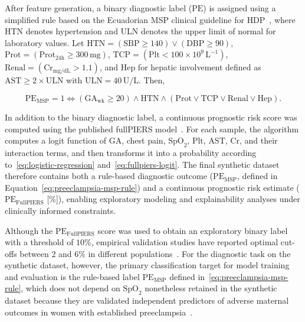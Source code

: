 \documentclass[diagnostics,article,accept,pdftex,moreauthors]{Definitions/mdpi}
\begin{document}
After feature generation, a binary diagnostic label
($\mathrm{PE}$) is assigned using a simplified rule based on the
Ecuadorian \ac{MSP} clinical guideline for \ac{HDP}~\cite{msp_ecuador_hdp_2013},
where \ac{HTN} denotes hypertension and \ac{ULN} denotes the upper limit of
normal for laboratory values.
Let \(\mathrm{HTN}=(\mathrm{SBP}\geq 140)\lor(\mathrm{DBP}\geq 90)\),
\(\mathrm{Prot}=(\mathrm{Prot_{24h}}\geq 300\,\mathrm{mg})\),
\(\mathrm{TCP}=(\mathrm{Plt}<100\times10^{9}\,\mathrm{L}^{-1})\),
\(\mathrm{Renal}=(\mathrm{Cr}_{\mathrm{mg/dL}}>1.1)\), and
\(\mathrm{Hep}\) for hepatic involvement defined as
\(\mathrm{AST}\geq 2\times\mathrm{ULN}\) with
\(\mathrm{ULN}=40\,\mathrm{U/L}\). Then,
\begin{linenomath}
\begin{equation}
\mathrm{PE}_{\mathrm{MSP}}=1
\iff
(\mathrm{GA_{wk}}\geq 20)\land \mathrm{HTN}
\land (\mathrm{Prot}\lor \mathrm{TCP}\lor \mathrm{Renal}\lor \mathrm{Hep}).
\label{eq:preeclampsia-msp-rule}
\end{equation}
\end{linenomath}

In addition to the binary diagnostic label, a continuous prognostic
risk score was computed using the published fullPIERS
model~\cite{fullpiers_2011}. For each sample, the algorithm computes a
logit function of \ac{GA}, chest {pain}, $\text{SpO}_2$, %
$\mathrm{Plt}$, \ac{AST}, $\mathrm{Cr}$, and their interaction terms,
and then transforms it into a probability according
to~\eqref{eq:logistic-regression} and~\eqref{eq:fullpiers-logit}.
The final synthetic dataset therefore contains both a rule-based
diagnostic outcome ($\mathrm{PE}_{\mathrm{MSP}}$, defined in
Equation~\eqref{eq:preeclampsia-msp-rule}) and a continuous prognostic
risk estimate ($\mathrm{PE}_{\mathrm{FullPIERS}}$ [\%]), enabling exploratory
modeling and explainability analyses under clinically informed
constraints.

Although the $\mathrm{PE}_{\mathrm{FullPIERS}}$ score was used to
obtain an exploratory binary label with a threshold of $10\%$, empirical
validation studies have reported optimal cut-offs between 2 and 6\%
in different populations~\cite{long2025fullpiers,teichmann2025fullpiers,elongi2025fullpiers}.
For the diagnostic task on the synthetic dataset, however, the primary
classification target for model training and evaluation is the rule-based
label $\mathrm{PE}_{\mathrm{MSP}}$ defined in~\eqref{eq:preeclampsia-msp-rule},
which does not depend {on} $\text{SpO}_2$ %
nonetheless retained in the synthetic dataset because they are validated
independent predictors of adverse maternal outcomes in women with
established preeclampsia~\cite{millman2011spo2,elongi2025fullpiers}.
\end{document}
